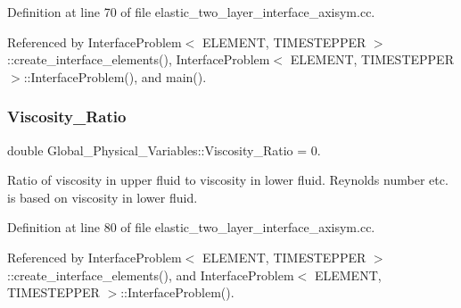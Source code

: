 Definition at line 70 of file elastic\+\_\+two\+\_\+layer\+\_\+interface\+\_\+axisym.\+cc.



Referenced by Interface\+Problem$<$ E\+L\+E\+M\+E\+N\+T, T\+I\+M\+E\+S\+T\+E\+P\+P\+E\+R $>$\+::create\+\_\+interface\+\_\+elements(), Interface\+Problem$<$ E\+L\+E\+M\+E\+N\+T, T\+I\+M\+E\+S\+T\+E\+P\+P\+E\+R $>$\+::\+Interface\+Problem(), and main().

\mbox{\label{namespaceGlobal__Physical__Variables_adb51428300a01b19395c43c0d3586d6f}} 
\subsubsection{\texorpdfstring{Viscosity\+\_\+\+Ratio}{Viscosity\_Ratio}}
{\footnotesize\ttfamily double Global\+\_\+\+Physical\+\_\+\+Variables\+::\+Viscosity\+\_\+\+Ratio = 0.}



Ratio of viscosity in upper fluid to viscosity in lower fluid. Reynolds number etc. is based on viscosity in lower fluid. 



Definition at line 80 of file elastic\+\_\+two\+\_\+layer\+\_\+interface\+\_\+axisym.\+cc.



Referenced by Interface\+Problem$<$ E\+L\+E\+M\+E\+N\+T, T\+I\+M\+E\+S\+T\+E\+P\+P\+E\+R $>$\+::create\+\_\+interface\+\_\+elements(), and Interface\+Problem$<$ E\+L\+E\+M\+E\+N\+T, T\+I\+M\+E\+S\+T\+E\+P\+P\+E\+R $>$\+::\+Interface\+Problem().

